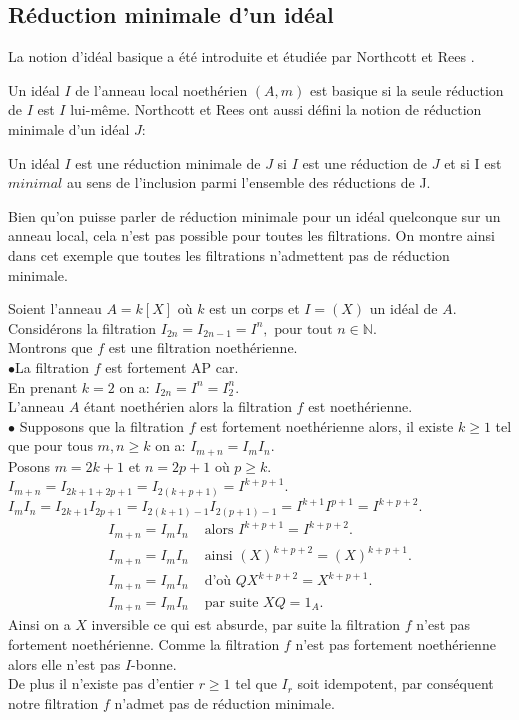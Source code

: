 \subsection{Réduction minimale d'un idéal}
La notion d'idéal basique a été introduite et étudiée par Northcott et Rees \cite{No}.
\begin{madefinition}
	Un idéal $I$ de l'anneau local noethérien $(A,m)$ est basique si la seule réduction de $I$ est $I$ lui-m\^{e}me. 
	Northcott et Rees ont aussi défini la notion de réduction minimale d'un idéal $J$:
	
	Un idéal $I$ est une réduction minimale de $J$ si $I$ est une réduction de $J$ et si I est $minimal$ au sens de l'inclusion parmi l'ensemble des réductions de J. 
\end{madefinition}
\begin{maremarque}
	Bien qu'on puisse parler de réduction minimale pour un idéal quelconque sur un anneau local, cela n'est pas possible pour toutes les filtrations. On montre ainsi dans cet exemple que toutes les filtrations n'admettent pas de réduction minimale.
\end{maremarque}
\begin{monexemple}
	Soient l'anneau $A = k\left[ X\right]$ où $k$ est un corps et $I = (X)$ un idéal de $A$.\\
	Considérons la filtration $I_{2n} = I_{2n-1} = I^n, \text{ pour tout } n \in \mathbb{N}$.\\
	Montrons que $f$ est une filtration noethérienne.\\
	$\bullet$La filtration $f$ est fortement AP car.\\En prenant $k = 2$ on a: $I_{2n} = I^n = I_2^n$.\\
	L’anneau $A$ étant noethérien alors la filtration $f$ est noethérienne.\\
	$\bullet$ Supposons que la filtration $f$ est fortement noethérienne alors, il existe $k \geq 1$ tel que pour tous $m, n \geq k$ on a: $I_{m+n} = I_m I_n$.\\
	Posons $m = 2k+1$ et $n = 2p+1$ où $p \geq k$.\\
	$I_{m+n} = I_{2k+1+2p+1} = I_{2(k+p+1)} = I^{k+p+1}$.\\
	$I_m I_n =  I_{2k+1}  I_{2p+1} =  I_{2(k+1)-1}  I_{2(p+1)-1} = I^{k+1} I^{p+1} = I^{k+p+2}.$
	\begin{align*}
		I_{m+n} = I_m I_n &\text{ alors } I^{k+p+1} = I^{k+p+2}.\\
		I_{m+n} = I_m I_n & \text{ ainsi } (X)^{k+p+2} = (X)^{k+p+1}.\\
		I_{m+n} = I_m I_n &\text{ d'où } QX^{k+p+2} = X^{k+p+1}.\\
		I_{m+n} = I_m I_n &\text{ par suite } XQ = 1_A.
	\end{align*}
	Ainsi on a $X$ inversible ce qui est absurde, par suite la filtration $f$ n'est pas fortement  noethérienne. Comme la filtration $f$ n'est pas fortement noethérienne alors elle n'est pas $I$-bonne.\\ De plus il n'existe pas d'entier $r \geq 1$ tel que $I_r$ soit idempotent, par conséquent notre filtration $f$ n'admet pas de réduction minimale.
\end{monexemple}
